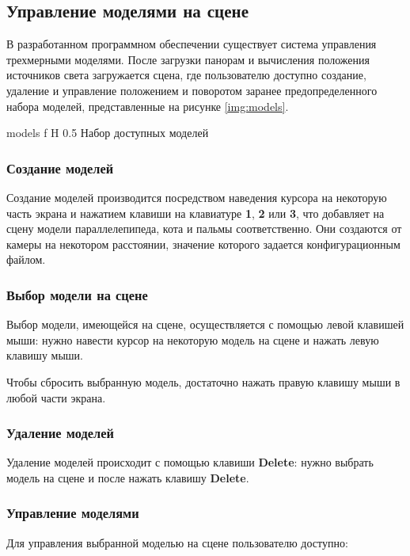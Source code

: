 \subsection{Управление моделями на сцене}

В разработанном программном обеспечении существует система управления трехмерными моделями. После загрузки панорам и вычисления положения источников света загружается сцена, где пользователю доступно создание, удаление и управление положением и поворотом заранее предопределенного набора моделей, представленные на рисунке \ref{img:models}. 

{models}
{f}
{H}
{0.5\textwidth}
{Набор доступных моделей}

\subsubsection*{Создание моделей}

Создание моделей производится посредством наведения курсора на некоторую часть экрана и нажатием клавиши на клавиатуре \textbf{1}, \textbf{2} или \textbf{3}, что добавляет на сцену модели параллелепипеда, кота и пальмы соответственно. Они создаются от камеры на некотором расстоянии, значение которого задается конфигурационным файлом.

\subsubsection*{Выбор модели на сцене}

Выбор модели, имеющейся на сцене, осуществляется с помощью левой клавишей мыши: нужно навести курсор на некоторую модель на сцене и нажать левую клавишу мыши. 

Чтобы сбросить выбранную модель, достаточно нажать правую клавишу мыши в любой части экрана.

\subsubsection*{Удаление моделей}

Удаление моделей происходит с помощью клавиши \textbf{Delete}: нужно выбрать модель на сцене и после нажать клавишу \textbf{Delete}.

\subsubsection*{Управление моделями}

Для управления выбранной моделью на сцене пользователю доступно:

